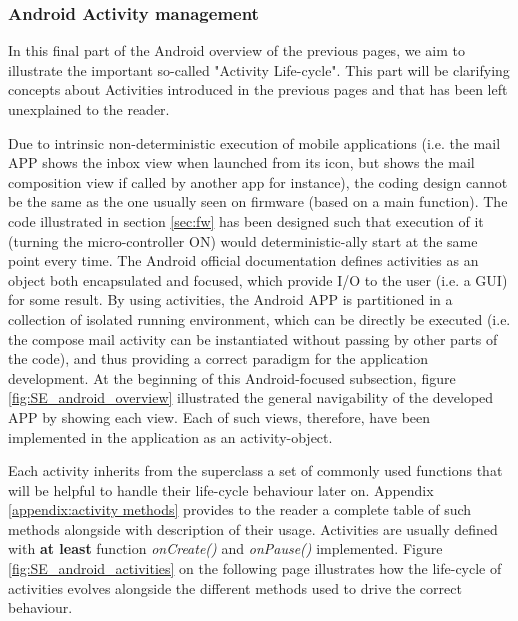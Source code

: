 \vspace{0.5cm}

\vspace{0.5cm}

\subsubsection{Android Activity management}
\label{subsubsec:android-activities} 

In this final part of the Android overview of the previous pages, we aim to illustrate the important so-called "Activity Life-cycle". This part will be clarifying concepts about Activities introduced in the previous pages and that has been left unexplained to the reader. 

\medskip
Due to intrinsic non-deterministic execution of mobile applications (i.e. the mail APP shows the inbox view when launched from its icon, but shows the mail composition view if called by another app for instance), the coding design cannot be the same as the one usually seen on firmware (based on a main function). The code illustrated in section \ref{sec:fw} has been designed such that execution of it (turning the micro-controller ON) would deterministic-ally start at the same point every time. The Android official documentation defines activities as an object both encapsulated and focused, which provide I/O to the user (i.e. a GUI) for some result. By using activities, the Android APP is partitioned in a collection of isolated running environment, which can be directly be executed (i.e. the compose mail activity can be instantiated without passing by other parts of the code), and thus providing a correct paradigm for the application development. At the beginning of this Android-focused subsection, figure \ref{fig:SE_android_overview} illustrated the general navigability of the developed APP by showing each view. Each of such views, therefore, have been implemented in the application as an activity-object.

\medskip
Each activity inherits from the superclass a set of commonly used functions that will be helpful to handle their life-cycle behaviour later on. Appendix \ref{appendix:activity methods} provides to the reader a complete table of such methods alongside with description of their usage. Activities are usually defined with \textbf{at least} function \textit{onCreate()} and \textit{onPause()} implemented. Figure \ref{fig:SE_android_activities} on the following page illustrates how the life-cycle of activities evolves alongside the different methods used to drive the correct behaviour.

